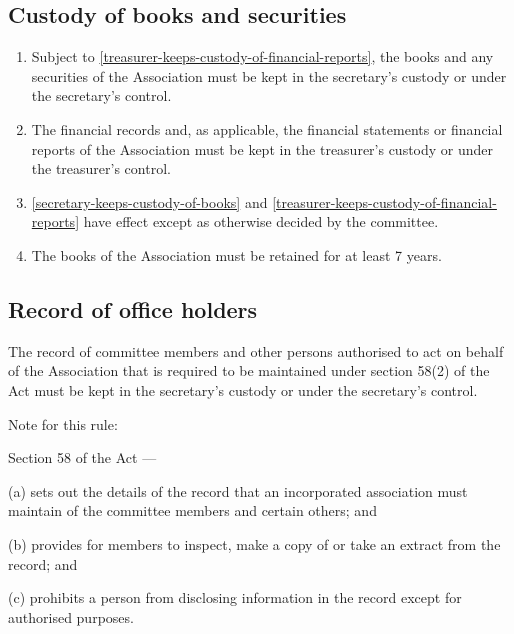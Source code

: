 \documentclass[../constitution.tex]{subfiles}
\begin{document}
\hypertarget{custody-of-books-and-securities}{%
\subsection{Custody of books and securities}\label{custody-of-books-and-securities}}

\begin{enumerate}

\item Subject to  \ref{treasurer-keeps-custody-of-financial-reports}, the books and any securities of the Association must be kept in the secretary's custody or under the secretary's control. \label{secretary-keeps-custody-of-books}
\item The financial records and, as applicable, the financial statements or financial reports of the Association must be kept in the treasurer's custody or under the treasurer's control. \label{treasurer-keeps-custody-of-financial-reports}
\item {} \ref{secretary-keeps-custody-of-books} and \ref{treasurer-keeps-custody-of-financial-reports} have effect except as otherwise decided by the committee.
\item The books of the Association must be retained for at least 7 years.
\end{enumerate}

\hypertarget{record-of-office-holders}{%
\subsection{Record of office holders}\label{record-of-office-holders}}

The record of committee members and other persons authorised to act on behalf of the Association that is required to be maintained under section 58(2) of the Act must be kept in the secretary's custody or under the secretary's control.


Note for this rule: 

Section 58 of the Act — 

(a) sets out the details of the record that an incorporated association must maintain of the committee members and certain others; and 

(b) provides for members to inspect, make a copy of or take an extract from the record; and 

(c) prohibits a person from disclosing information in the record except for authorised purposes. 
\end{document}
